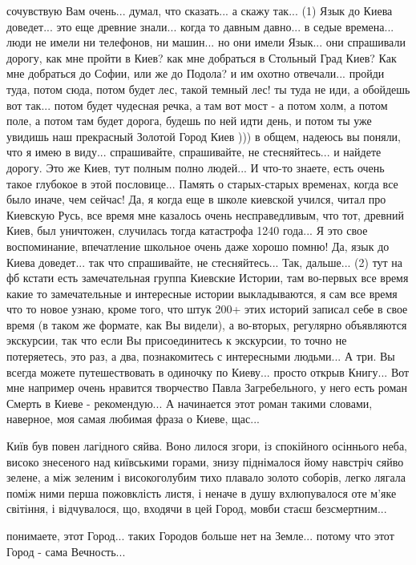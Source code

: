 сочувствую Вам очень... думал, что сказать... а скажу так... (1) Язык до Киева
доведет... это еще древние знали... когда то давным давно... в седые времена...
люди не имели ни телефонов, ни машин... но они имели Язык... они спрашивали
дорогу, как мне пройти в Киев? как мне добраться в Стольный Град Киев? Как мне
добраться до Софии, или же до Подола? и им охотно отвечали... пройди туда,
потом сюда, потом будет лес, такой темный лес!  ты туда не иди, а обойдешь вот
так... потом будет чудесная речка, а там вот мост - а потом холм, а потом поле,
а потом там будет дорога, будешь по ней идти день, и потом ты уже увидишь наш
прекрасный Золотой Город Киев ))) в общем, надеюсь вы поняли, что я имею в
виду... спрашивайте, спрашивайте, не стесняйтесь... и найдете дорогу. Это же
Киев, тут полным полно людей... И что-то знаете, есть очень такое глубокое в
этой пословице... Память о старых-старых временах, когда все было иначе, чем
сейчас! Да, я когда еще в школе киевской учился, читал про Киевскую Русь, все
время мне казалось очень несправедливым, что тот, древний Киев, был уничтожен,
случилась тогда катастрофа 1240 года... Я это свое воспоминание, впечатление
школьное очень даже хорошо помню! Да, язык до Киева доведет... так что
спрашивайте, не стесняйтесь... Так, дальше... (2) тут на фб кстати есть
замечательная группа Киевские Истории, там во-первых все время какие то
замечательные и интересные истории выкладываются, я сам все время что то новое
узнаю, кроме того, что штук 200+ этих историй записал себе в свое время (в
таком же формате, как Вы видели), а во-вторых, регулярно объявляются экскурсии,
так что если Вы присоединитесь к экскурсии, то точно не потеряетесь, это раз, а
два, познакомитесь с интересными людьми... А три. Вы всегда можете
путешествовать в одиночку по Киеву... просто открыв Книгу... Вот мне например
очень нравится творчество Павла Загребельного, у него есть роман Смерть в Киеве
- рекомендую... А начинается этот роман такими словами, наверное, моя самая
любимая фраза о Киеве, щас...  
 
Київ був повен лагідного сяйва. Воно лилося згори, із спокійного осіннього
неба, високо знесеного над київськими горами, знизу піднімалося йому навстріч
сяйво зелене, а між зеленим і високоголубим тихо плавало золото соборів, легко
лягала поміж ними перша пожовклість листя, і неначе в душу вхлюпувалося оте
м'яке світіння, і відчувалося, що, входячи в цей Город, мовби стаєш безсмертним...

понимаете, этот Город... таких Городов больше нет на Земле... 
потому что этот Город - сама Вечность...

